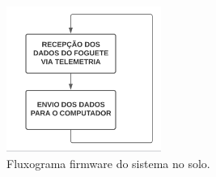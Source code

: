 


\begin{figure}[ht]
    \centering
    \caption{Fluxograma firmware do sistema no solo.}
    \begin{center}
        \includegraphics[width=0.45\textwidth]{img/Fluxograma_Firmware2.png}
    \end{center}
    \vspace{-0.5cm}
    \label{fig:Fluxograma_firmware2}
\end{figure}